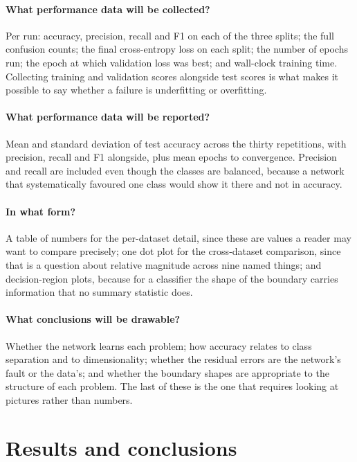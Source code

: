 \documentclass[11pt]{article}
\begin{document}
\paragraph{What performance data will be collected?}
Per run: accuracy, precision, recall and F1 on each of the three splits; the
full confusion counts; the final cross-entropy loss on each split; the number of
epochs run; the epoch at which validation loss was best; and wall-clock training
time. Collecting training and validation scores alongside test scores is what
makes it possible to say whether a failure is underfitting or overfitting.

\paragraph{What performance data will be reported?}
Mean and standard deviation of test accuracy across the thirty repetitions, with
precision, recall and F1 alongside, plus mean epochs to convergence. Precision
and recall are included even though the classes are balanced, because a network
that systematically favoured one class would show it there and not in accuracy.

\paragraph{In what form?}
A table of numbers for the per-dataset detail, since these are values a reader
may want to compare precisely; one dot plot for the cross-dataset comparison,
since that is a question about relative magnitude across nine named things; and
decision-region plots, because for a classifier the shape of the boundary
carries information that no summary statistic does.

\paragraph{What conclusions will be drawable?}
Whether the network learns each problem; how accuracy relates to class
separation and to dimensionality; whether the residual errors are the
network's fault or the data's; and whether the boundary shapes are appropriate
to the structure of each problem. The last of these is the one that requires
looking at pictures rather than numbers.

\section{Results and conclusions}
\label{sec:results}
\end{document}
